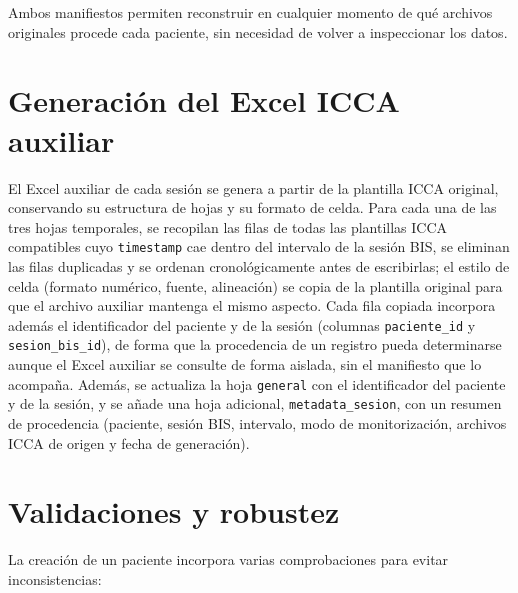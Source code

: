 \documentclass[
  spanish,
  a4paper,
  12pt,
  twoside]{memoir}
\begin{document}
Ambos manifiestos permiten reconstruir en cualquier momento de qué
archivos originales procede cada paciente, sin necesidad de volver a
inspeccionar los datos.

\section{Generación del Excel ICCA
auxiliar}\label{generaciuxf3n-del-excel-icca-auxiliar}

El Excel auxiliar de cada sesión se genera a partir de la plantilla ICCA
original, conservando su estructura de hojas y su formato de celda. Para
cada una de las tres hojas temporales, se recopilan las filas de todas
las plantillas ICCA compatibles cuyo \texttt{timestamp} cae dentro del
intervalo de la sesión BIS, se eliminan las filas duplicadas y se
ordenan cronológicamente antes de escribirlas; el estilo de celda
(formato numérico, fuente, alineación) se copia de la plantilla original
para que el archivo auxiliar mantenga el mismo aspecto. Cada fila
copiada incorpora además el identificador del paciente y de la sesión
(columnas \texttt{paciente\_id} y \texttt{sesion\_bis\_id}), de forma
que la procedencia de un registro pueda determinarse aunque el Excel
auxiliar se consulte de forma aislada, sin el manifiesto que lo
acompaña. Además, se actualiza la hoja \texttt{general} con el
identificador del paciente y de la sesión, y se añade una hoja
adicional, \texttt{metadata\_sesion}, con un resumen de procedencia
(paciente, sesión BIS, intervalo, modo de monitorización, archivos ICCA
de origen y fecha de generación).

\section{Validaciones y robustez}\label{validaciones-y-robustez}

La creación de un paciente incorpora varias comprobaciones para evitar
inconsistencias:
\end{document}

